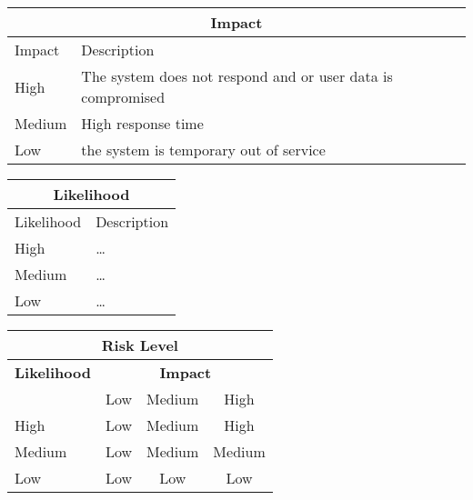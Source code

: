 \documentclass{article}
\begin{document}

\begin{center}
\begin{tabular}{|l|l|}
\hline
\multicolumn{2}{|c|}{\bf Impact} \\
\hline
Impact & Description \\
\hline
\hline
High   & The system does not respond and or user data is compromised \\
\hline
Medium & High response time \\
\hline
Low   & the system is temporary out of service\\
\hline
\end{tabular}
%
%
\begin{tabular}{|l|l|}
\hline
\multicolumn{2}{|c|}{\bf Likelihood} \\
\hline
Likelihood & Description \\
\hline
\hline
High   & \hspace*{20pt}\ldots \\
\hline
Medium & \hspace*{20pt}\ldots \\
\hline
Low   & \hspace*{20pt}\ldots \\
\hline
\end{tabular}
\end{center}

\vspace{5mm}

\begin{center}
\begin{tabular}{|l|c|c|c|}
\hline
\multicolumn{4}{|c|}{{\bf Risk Level}} \\
\hline
{{\bf Likelihood}} & \multicolumn{3}{c|}{{\bf Impact}} \\ %
     & Low & Medium & High \\  \hline
 High & Low & Medium & High  \\
\hline
 Medium & Low & Medium & Medium \\
\hline
 Low & Low & Low & Low \\
\hline
\end{tabular}
\end{center}
\end{document}
